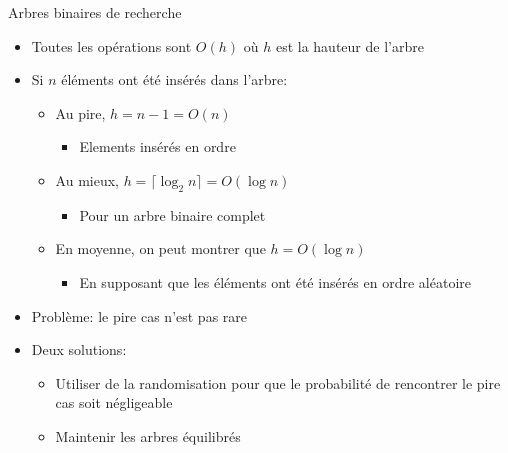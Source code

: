 \begin{frame}{Arbres binaires de recherche}

\begin{itemize}
\item Toutes les opérations sont $O(h)$ où $h$ est la hauteur de l'arbre
\item Si $n$ éléments ont été insérés dans l'arbre:
\begin{itemize}
\item Au pire, $h=n-1=O(n)$
\begin{itemize}
\item Elements insérés en ordre
\end{itemize}
\item Au mieux, $h=\lceil\log_2 n\rceil=O(\log n)$
\begin{itemize}
\item Pour un arbre binaire complet
\end{itemize}
\item En moyenne, on peut montrer que $h=O(\log n)$
\begin{itemize}
\item En supposant que les éléments ont été insérés en ordre aléatoire
\end{itemize}
\end{itemize}
\item Problème:  le pire cas n'est pas rare

\bigskip

\item Deux solutions:
\begin{itemize}
\item Utiliser de la randomisation pour que le probabilité de rencontrer le pire cas soit négligeable
\item Maintenir les arbres équilibrés
\end{itemize}
\end{itemize}
\end{frame}

